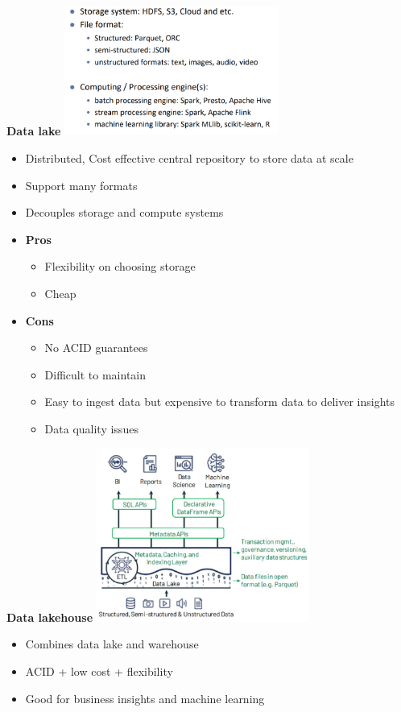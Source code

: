 \documentclass[10pt, landscape]{article}
\begin{document}
\begin{multicols}{4}
\textbf{Data lake}
\includegraphics*[width=7cm]{datalake_choices.png}
\begin{itemize}
  \item Distributed, Cost effective central repository to store data at scale
  \item Support many formats
  \item Decouples storage and compute systems 
  \item \textbf{Pros}
  \begin{itemize}
    \item Flexibility on choosing storage
    \item Cheap 
  \end{itemize}
\item \textbf{Cons}
\begin{itemize}
  \item No ACID guarantees
  \item Difficult to maintain 
  \item Easy to ingest data but expensive to transform data to deliver insights 
  \item Data quality issues 
\end{itemize}
\end{itemize}

\textbf{Data lakehouse}
\includegraphics*[width=7cm]{data_lakehouse.png}
\begin{itemize}
  \item Combines data lake and warehouse 
  \item ACID + low cost + flexibility
  \item Good for business insights and machine learning 
\end{itemize}


\end{multicols}
\end{document}
